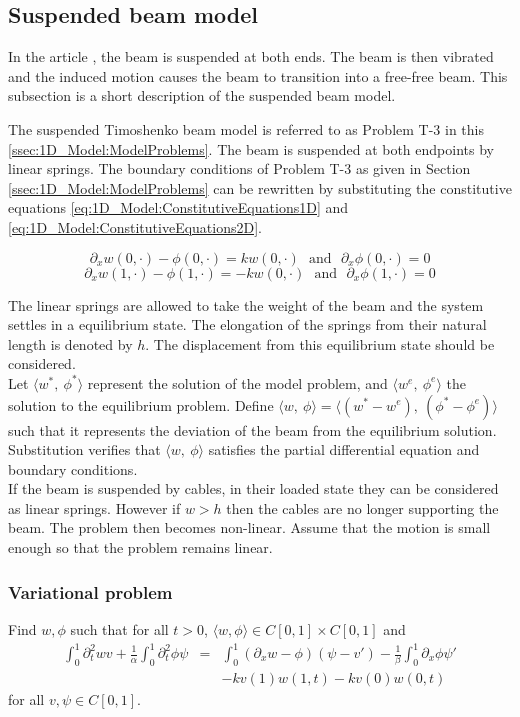 \documentclass[../../main.tex]{subfiles}
\begin{document}
\subsection{Suspended beam model}
In the article \cite{SP06}, the beam is suspended at both ends. The beam is then vibrated and the induced motion causes the beam to transition into a free-free beam. This subsection is a short description of the suspended beam model.

The suspended Timoshenko beam model is referred to as Problem T-3 in this \ref{ssec:1D_Model:ModelProblems}. The beam is suspended at both endpoints by linear springs. The boundary conditions of Problem T-3 as given in Section \ref{ssec:1D_Model:ModelProblems} can be rewritten by substituting the constitutive equations \eqref{eq:1D_Model:ConstitutiveEquations1D} and \eqref{eq:1D_Model:ConstitutiveEquations2D}.

	\[\partial_{x}w(0,\cdot) - \phi(0,\cdot) = kw(0,\cdot)  \ \ \ \textrm{and} \ \ \ \partial_{x}\phi(0,\cdot) = 0\]
	\[\partial_{x}w(1,\cdot) - \phi(1,\cdot) = -kw(0,\cdot) \ \  \ \textrm{and} \ \ \ \partial_{x}\phi(1,\cdot) = 0\]

The linear springs are allowed to take the weight of the beam and the system settles in a equilibrium state. The elongation of the springs from their natural length is denoted by $h$. The displacement from this equilibrium state should be considered.\\ 

Let $\langle w^*, \ \phi^*\rangle$ represent the solution of the model problem, and $\langle w^e, \ \phi^e \rangle$ the solution to the equilibrium problem. Define $\langle w, \ \phi\rangle = \langle(w^*-w^e), \ (\phi^*-\phi^e)\rangle$ such that it represents the deviation of the beam from the equilibrium solution. Substitution verifies that $\langle w, \ \phi\rangle$ satisfies the partial differential equation and boundary conditions.\\

If the beam is suspended by cables, in their loaded state they can be considered as linear springs. However if $w > h$ then the cables are no longer supporting the beam. The problem then becomes non-linear. Assume that the motion is small enough so that the problem remains linear.

\subsubsection{Variational problem}
Find $w,\phi$ such that for all $t>0$, $\langle w,\phi \rangle \in C[0,1]\times C[0,1]$ and
\begin{eqnarray*}
	\int_{0}^{1} \partial_{t}^{2} wv + \frac{1}{\alpha}\int_{0}^{1}  \partial_{t}^{2} \phi \psi &=& \int_{0}^{1} (\partial_{x}w - \phi)(\psi -v')  - \frac{1}{\beta}\int_{0}^{1}\partial_{x}\phi \psi'\\
	& & - kv(1)w(1,t) - kv(0)w(0,t)
\end{eqnarray*} for all $v,\psi \in C[0,1]$.\\
\end{document}
